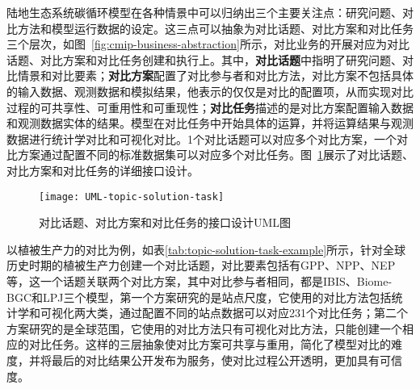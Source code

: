 陆地生态系统碳循环模型在各种情景中可以归纳出三个主要关注点：研究问题、对比方法和模型运行数据的设定。这三点可以抽象为对比话题、对比方案和对比任务三个层次，如图~\ref{fig:cmip-business-abstraction}所示，对比业务的开展对应为对比话题、对比方案和对比任务创建和执行上。其中，\textbf{对比话题}中指明了研究问题、对比情景和对比要素；\textbf{对比方案}配置了对比参与者和对比方法，对比方案不包括具体的输入数据、观测数据和模拟结果，他表示的仅仅是对比的配置项，从而实现对比过程的可共享性、可重用性和可重现性；\textbf{对比任务}描述的是对比方案配置输入数据和观测数据实体的结果。模型在对比任务中开始具体的运算，并将运算结果与观测数据进行统计学对比和可视化对比。1个对比话题可以对应多个对比方案，一个对比方案通过配置不同的标准数据集可以对应多个对比任务。图~\ref{fig:UML-topic-solution-task}展示了对比话题、对比方案和对比任务的详细接口设计。

\begin{figure}[!htbp]
    \centering
    \texttt{[image: UML-topic-solution-task]}
    \caption{对比话题、对比方案和对比任务的接口设计UML图}
    \label{fig:UML-topic-solution-task}
\end{figure}

以植被生产力的对比为例，如表\ref{tab:topic-solution-task-example}所示，针对全球历史时期的植被生产力创建一个对比话题，对比要素包括有GPP、NPP、NEP等，这一个话题关联两个对比方案，其中对比参与者相同，都是IBIS、Biome-BGC和LPJ三个模型，第一个方案研究的是站点尺度，它使用的对比方法包括统计学和可视化两大类，通过配置不同的站点数据可以对应231个对比任务；第二个方案研究的是全球范围，它使用的对比方法只有可视化对比方法，只能创建一个相应的对比任务。这样的三层抽象使对比方案可共享与重用，简化了模型对比的难度，并将最后的对比结果公开发布为服务，使对比过程公开透明，更加具有可信度。

